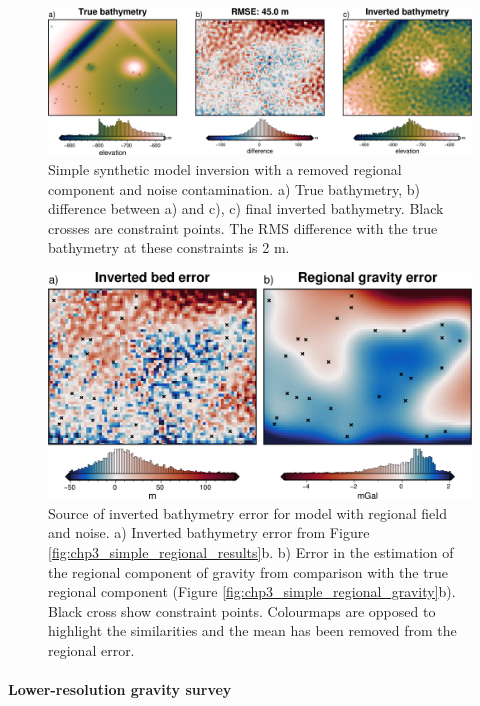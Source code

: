 \begin{figure}[!ht]
    \centering
    \includegraphics[width=.95\textwidth]{figures/chp3/chp3_simple_regional_noise_results.png}
    \caption[Synthetic inversion with regional and noise, results]{Simple synthetic model inversion with a removed regional component and noise contamination. a) True bathymetry, b) difference between a) and c), c) final inverted bathymetry. Black crosses are constraint points. The RMS difference with the true bathymetry at these constraints is 2 m.}
    \label{fig:appB_simple_regional_noise_results}
\end{figure}

\begin{figure}[!ht]
    \centering
    \includegraphics[width=.7\textwidth]{figures/chp3/chp3_simple_regional_noise_bed_error.png}
    \caption[Inversion and regional error for model with regional and noise]{Source of inverted bathymetry error for model with regional field and noise. a) Inverted bathymetry error from Figure \ref{fig:chp3_simple_regional_results}b. b) Error in the estimation of the regional component of gravity from comparison with the true regional component (Figure \ref{fig:chp3_simple_regional_gravity}b). Black cross show constraint points. Colourmaps are opposed to highlight the similarities and the mean has been removed from the regional error.}
    \label{fig:appB_simple_regional_noise_bed_error}
\end{figure}

\paragraph*{Lower-resolution gravity survey}

